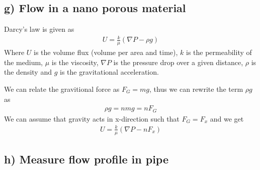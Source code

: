 \documentclass[reprint, amsmath, amssymb, aps]{revtex4-2}
\begin{document}
\subsection*{g) Flow in a nano porous material}

Darcy’s law is given as
\begin{align*}
  U = \frac{k}{\mu}(\nabla P - \rho g)
\end{align*}
Where $U$ is the volume flux (volume per area and time), $k$ is the permeability of the medium, $\mu$ is the viscosity, $\nabla P$ is the pressure drop over a given distance, $\rho$ is the density and $g$ is the gravitational acceleration. \par
We can relate the gravitional force as $F_G = mg$, thus we can rewrite the term $\rho g$ as
\begin{align*}
  \rho g = nmg = nF_G
\end{align*}
We can assume that gravity acts in x-direction such that $F_G = F_x$ and we get
\begin{align*}
  U = \frac{k}{\mu}(\nabla P - nF_x)
\end{align*}


\subsection*{h) Measure flow profile in pipe}
\end{document}
